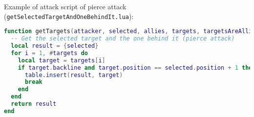 Example of attack script of pierce attack (\texttt{getSelectedTargetAndOneBehindIt.lua}):
\begin{center}
\begin{lstlisting}[language=Lua]
function getTargets(attacker, selected, allies, targets, targetsAreAllies, item, battle, isMarking)
  -- Get the selected target and the one behind it (pierce attack)
  local result = {selected}
  for i = 1, #targets do
    local target = targets[i]
    if target.backline and target.position == selected.position + 1 then
      table.insert(result, target)
      break
    end
  end
  return result
end
\end{lstlisting}
\end{center}
